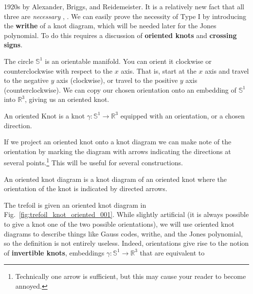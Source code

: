         1920s by Alexander, Briggs, and Reidemeister. It is a relatively new
        fact that all three are \textit{necessary}
        \cite{OstlundReidemeisterMoves2001},
        \cite{HaggeReidemeisterRequired2005}. We can easily prove the necessity
        of Type I by introducing the \textbf{writhe} of a knot diagram, which
        will be needed later for the Jones polynomial. To do this requires a
        discussion of \textbf{oriented knots} and \textbf{crossing signs}.
        \par\hfill\par
        The circle $\mathbb{S}^{1}$ is an orientable manifold. You can orient it
        clockwise or counterclockwise with respect to the $x$ axis. That is,
        start at the $x$ axis and travel to the negative $y$ axis
        (clockwise), or travel to the positive $y$ axis (counterclockwise).
        We can copy our chosen orientation onto an embedding of
        $\mathbb{S}^{1}$ into $\mathbb{R}^{3}$, giving us an oriented knot.
        \begin{definition}
            An oriented Knot is a knot
            $\gamma:\mathbb{S}^{1}\rightarrow\mathbb{R}^{3}$ equipped with an
            orientation, or a chosen direction.
        \end{definition}
        If we project an oriented knot onto a knot diagram we can make note of
        the orientation by marking the diagram with arrows indicating the
        directions at several points.\footnote{%
            Technically one arrow is sufficient, but this may cause your
            reader to become annoyed.
        }
        This will be useful for several constructions.
        \begin{definition}
            An oriented knot diagram is a knot diagram of an oriented knot
            where the orientation of the knot is indicated by directed arrows.
        \end{definition}
        The trefoil is given an oriented knot diagram in
        Fig.~\ref{fig:trefoil_knot_oriented_001}. While slightly artificial (it
        is always possible to give a knot one of the two possible
        orientations), we will use oriented knot diagrams to describe
        things like Gauss codes, writhe, and the Jones polynomial, so the
        definition is not entirely useless. Indeed, orientations give rise to
        the notion of \textbf{invertible knots}, embeddings
        $\gamma:\mathbb{S}^{1}\rightarrow\mathbb{R}^{3}$ that are equivalent to
